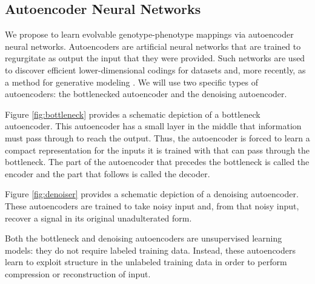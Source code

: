 \subsection{Autoencoder Neural Networks}

We propose to learn evolvable genotype-phenotype mappings via autoencoder neural networks.
Autoencoders are artificial neural networks that are trained to regurgitate as output the input that they were provided.
Such networks are used to discover efficient lower-dimensional codings for datasets and, more recently, as a method for generative modeling \cite{liou2014autoencoder, kingma2013auto}.
We will use two specific types of autoencoders: the bottlenecked autoencoder and the denoising autoencoder.



Figure \ref{fig:bottleneck} provides a schematic depiction of a bottleneck autoencoder.
This autoencoder has a small layer in the middle that information must pass through to reach the output.
Thus, the autoencoder is forced to learn a compact representation for the inputs it is trained with that can pass through the bottleneck.
The part of the autoencoder that precedes the bottleneck is called the encoder and the part that follows is called the decoder.

Figure \ref{fig:denoiser} provides a schematic depiction of a denoising autoencoder.
These autoencoders are trained to take noisy input and, from that noisy input, recover a signal in its original unadulterated form.

Both the bottleneck and denoising autoencoders are unsupervised learning models: they do not require labeled training data.
Instead, these autoencoders learn to exploit structure in the unlabeled training data in order to perform compression or reconstruction of input.

